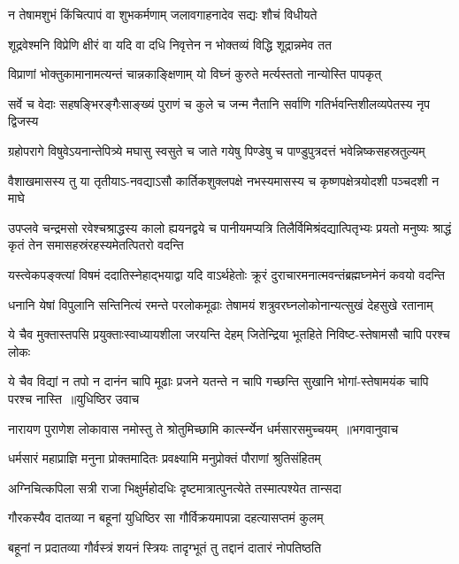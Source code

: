 \twolineshloka
{न तेषामशुभं किंचित्पापं वा शुभकर्मणाम्}
{जलावगाहनादेव सद्यः शौचं विधीयते}


\twolineshloka
{शूद्रवेश्मनि विप्रेणि क्षीरं वा यदि वा दधि}
{निवृत्तेन न भोक्तव्यं विद्धि शूद्रान्नमेव तत}


\twolineshloka
{विप्राणां भोक्तुकामानामत्यन्तं चान्नकाङ्क्षिणाम्}
{यो विघ्नं कुरुते मर्त्यस्ततो नान्योस्ति पापकृत्}


\twolineshloka
{सर्वे च वेदाः सहषङ्भिरङ्गैःसाङ्ख्यं पुराणं च कुले च जन्म}
{नैतानि सर्वाणि गतिर्भवन्तिशीलव्यपेतस्य नृप द्विजस्य}


\twolineshloka
{ग्रहोपरागे विषुवेऽयनान्तेपित्र्ये मघासु स्वसुते च जाते}
{गयेषु पिण्डेषु च पाण्डुपुत्रदत्तं भवेन्निष्कसहस्रतुल्यम्}


\twolineshloka
{वैशाखमासस्य तु या तृतीयाऽ-नवद्याऽसौ कार्तिकशुक्लपक्षे}
{नभस्यमासस्य च कृष्णपक्षेत्रयोदशी पञ्चदशी न माघे}


\threelineshloka
{उपप्लवे चन्द्रमसो रवेश्चश्राद्धस्य कालो ह्ययनद्वये च}
{पानीयमप्यत्रि तिलैर्विमिश्रंदद्यात्पितृभ्यः प्रयतो मनुष्यः}
{श्राद्धं कृतं तेन समासहस्रंरहस्यमेतत्पितरो वदन्ति}


\twolineshloka
{यस्त्वेकपङ्क्त्यां विषमं ददातिस्नेहाद्भयाद्वा यदि वाऽर्थहेतोः}
{क्रूरं दुराचारमनात्मवन्तंब्रह्मघ्नमेनं कवयो वदन्ति}


\twolineshloka
{धनानि येषां विपुलानि सन्तिनित्यं रमन्ते परलोकमूढाः}
{तेषामयं शत्रुवरघ्नलोकोनान्यत्सुखं देहसुखे रतानाम्}


\twolineshloka
{ये चैव मुक्तास्तपसि प्रयुक्ताःस्वाध्यायशीला जरयन्ति देहम्}
{जितेन्द्रिया भूतहिते निविष्ट-स्तेषामसौ चापि परश्च लोकः}


\threelineshloka
{ये चैव विद्यां न तपो न दानंन चापि मूढाः प्रजने यतन्ते}
{न चापि गच्छन्ति सुखानि भोगां-स्तेषामयंक चापि परश्च नास्ति ॥युधिष्ठिर उवाच}
{}


\threelineshloka
{नारायण पुराणेश लोकावास नमोस्तु ते}
{श्रोतुमिच्छामि कार्त्स्न्येन धर्मसारसमुच्चयम् ॥भगवानुवाच}
{}


\twolineshloka
{धर्मसारं महाप्राज्ञि मनुना प्रोक्तमादितः}
{प्रवक्ष्यामि मनुप्रोक्तं पौराणां श्रुतिसंहितम्}


\twolineshloka
{अग्निचित्कपिला सत्री राजा भिक्षुर्महोदधिः}
{दृष्टमात्रात्पुनत्येते तस्मात्पश्येत तान्सदा}


\twolineshloka
{गौरकस्यैव दातव्या न बहूनां युधिष्ठिर}
{सा गौर्विक्रयमापन्ना दहत्यासप्तमं कुलम्}


\twolineshloka
{बहूनां न प्रदातव्या गौर्वस्त्रं शयनं स्त्रियः}
{तादृग्भूतं तु तद्दानं दातारं नोपतिष्ठति}


